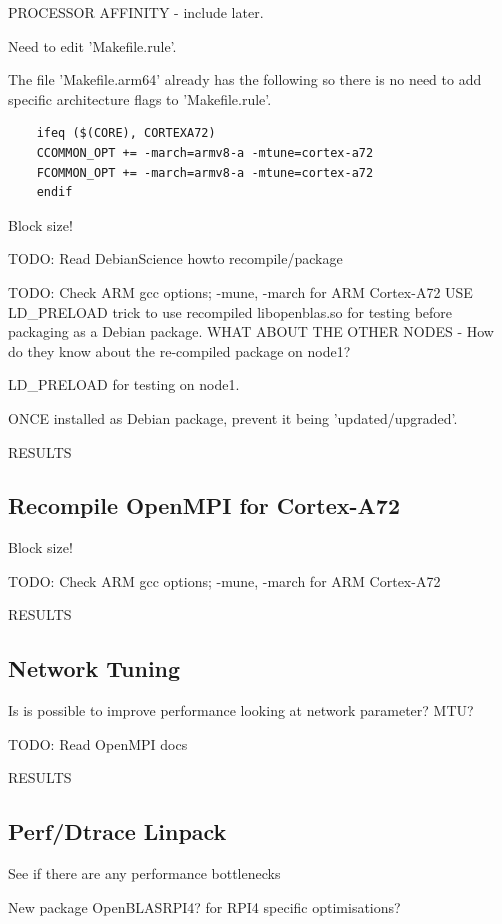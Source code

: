 \documentclass{article}
\begin{document}
PROCESSOR AFFINITY - include later.

Need to edit 'Makefile.rule'.

The file 'Makefile.arm64' already has the following so there is no need to add specific architecture flags to 'Makefile.rule'.

\begin{verbatim}
    ifeq ($(CORE), CORTEXA72)
    CCOMMON_OPT += -march=armv8-a -mtune=cortex-a72
    FCOMMON_OPT += -march=armv8-a -mtune=cortex-a72
    endif
\end{verbatim}



Block size!

TODO: Read DebianScience howto recompile/package

TODO: Check ARM gcc options; -mune, -march for ARM Cortex-A72
USE LD\_PRELOAD trick to use recompiled libopenblas.so for testing before packaging as a Debian package. WHAT ABOUT THE OTHER NODES - How do they know about the re-compiled package on node1?

LD\_PRELOAD for testing on node1.

ONCE installed as Debian package, prevent it being 'updated/upgraded'.

RESULTS

\subsection{Recompile OpenMPI for Cortex-A72}

Block size!

TODO: Check ARM gcc options; -mune, -march for ARM Cortex-A72

RESULTS

\subsection{Network Tuning}
Is is possible to improve performance looking at network parameter? MTU? 

TODO: Read OpenMPI docs

RESULTS

\subsection{Perf/Dtrace Linpack}
See if there are any performance bottlenecks

New package OpenBLASRPI4? for RPI4 specific optimisations?
\end{document}
